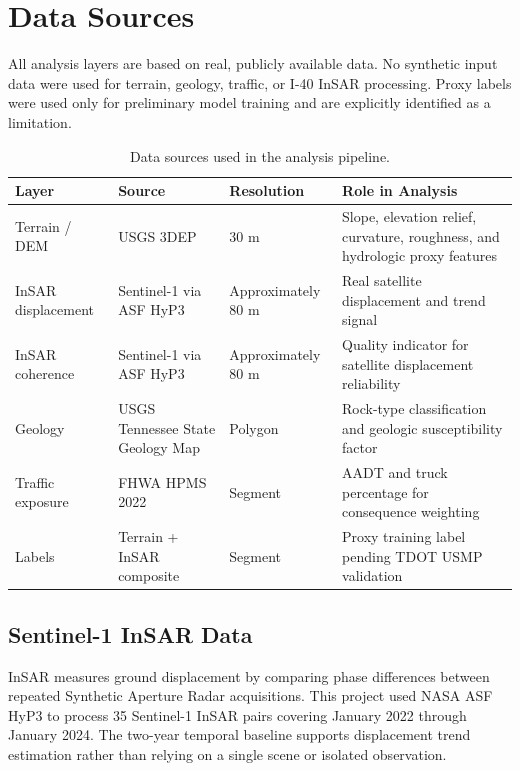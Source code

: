 \documentclass[11pt,letterpaper]{article}
\begin{document}
\section{Data Sources}
\label{sec:data}

All analysis layers are based on real, publicly available data. No synthetic input data were used for terrain, geology, traffic, or I-40 InSAR processing. Proxy labels were used only for preliminary model training and are explicitly identified as a limitation.

\begin{table}[H]
\centering
\caption{Data sources used in the analysis pipeline.}
\label{tab:datasources}
\begin{tabularx}{\linewidth}{L{3cm}L{3.2cm}L{2.1cm}Y}
\toprule
\textbf{Layer} &
\textbf{Source} &
\textbf{Resolution} &
\textbf{Role in Analysis} \\
\midrule
Terrain / DEM & USGS 3DEP & 30 m & Slope, elevation relief, curvature, roughness, and hydrologic proxy features \\
InSAR displacement & Sentinel-1 via ASF HyP3 & Approximately 80 m & Real satellite displacement and trend signal \\
InSAR coherence & Sentinel-1 via ASF HyP3 & Approximately 80 m & Quality indicator for satellite displacement reliability \\
Geology & USGS Tennessee State Geology Map & Polygon & Rock-type classification and geologic susceptibility factor \\
Traffic exposure & FHWA HPMS 2022 & Segment & AADT and truck percentage for consequence weighting \\
Labels & Terrain + InSAR composite & Segment & Proxy training label pending TDOT USMP validation \\
\bottomrule
\end{tabularx}
\end{table}

\subsection{Sentinel-1 InSAR Data}

InSAR measures ground displacement by comparing phase differences between repeated Synthetic Aperture Radar acquisitions. This project used NASA ASF HyP3 to process 35 Sentinel-1 InSAR pairs covering January 2022 through January 2024. The two-year temporal baseline supports displacement trend estimation rather than relying on a single scene or isolated observation.
\end{document}
